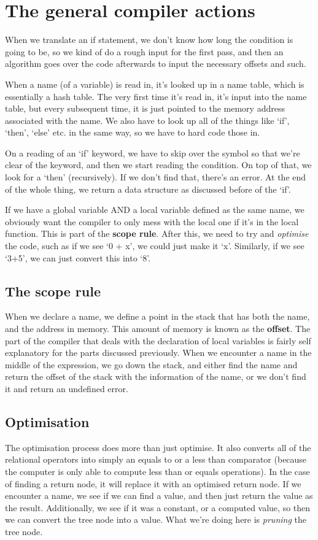 \documentclass[11pt,a4paper,titlepage,dvipsnames,cmyk]{scrartcl}
\begin{document}
\section{The general compiler actions}%
\label{sec:compiler}
When we translate an if statement, we don't know how long the condition is
going to be, so we kind of do a rough input for the first pass, and then
an algorithm goes over the code afterwards to input the necessary offsets
and such.

When a name (of a variable) is read in, it's looked up in a name table,
which is essentially a hash table. The very first time it's read in, it's
input into the name table, but every subsequent time, it is just pointed
to the memory address associated with the name. We also have to look up
all of the things like `if', `then', `else' etc. in the same way, so we
have to hard code those in.

On a reading of an `if' keyword, we have to skip over the symbol so that
we're clear of the keyword, and then we start reading the condition. On
top of that, we look for a `then' (recursively). If we don't find that,
there's an error. At the end of the whole thing, we return a data
structure as discussed before of the `if'.

If we have a global variable AND a local variable defined as the same
name, we obviously want the compiler to only mess with the local one if
it's in the local function. This is part of the \textbf{scope rule}. After
this, we need to try and \textit{optimise} the code, such as if we see `0
+ x', we could just make it `x'. Similarly, if we see `3+5', we can just
convert this into `8'.

\subsection{The scope rule}%
\label{sub:scope-rule}
When we declare a name, we define a point in the stack that has both the
name, and the address in memory. This amount of memory is known as the
\textbf{offset}. The part of the compiler that deals with the declaration
of local variables is fairly self explanatory for the parts discussed
previously. When we encounter a name in the middle of the expression, we
go down the stack, and either find the name and return the offset of the
stack with the information of the name, or we don't find it and return an
undefined error.

\subsection{Optimisation}%
\label{sub:Optimisation}
The optimisation process does more than just optimise. It also converts
all of the relational operators into simply an equals to or a less than
comparator (because the computer is only able to compute less than or
equals operations). In the case of finding a return node, it will replace
it with an optimised return node. If we encounter a name, we see if we can
find a value, and then just return the value as the result. Additionally,
we see if it was a constant, or a computed value, so then we can convert
the tree node into a value. What we're doing here is \textit{pruning} the
tree node.
\end{document}

